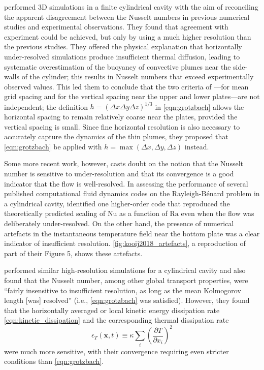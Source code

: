\documentclass[titlepage]{article}
\numberwithin{equation}{section}
\newcommand{\pdiff}[2]{\frac{\partial #1}{\partial #2}}
\renewcommand\vec{\bm}
\newcommand{\rayleigh}{\ensuremath{\mathrm{Ra}}}
\newcommand{\nusselt}{\ensuremath{\mathrm{Nu}}}
\newcommand{\rb}{Rayleigh-B\'{e}nard}
\begin{document}
\textcite{stevens2010} performed 3D simulations in a finite cylindrical cavity
with the aim of reconciling the apparent disagreement between the Nusselt
numbers in previous numerical studies and experimental observations. They found
that agreement with experiment could be achieved, but only by using a much
higher resolution than the previous studies. They offered the physical
explanation that horizontally under-resolved simulations produce insufficient
thermal diffusion, leading to systematic overestimation of the buoyancy of
convective plumes near the side-walls of the cylinder; this results in Nusselt
numbers that exceed experimentally observed values. This led them to conclude
that the two criteria of \textcite{grotzbach1983}---for mean grid spacing
and for the vertical spacing near the upper and lower plates---are not
independent; the definition $h = (\Delta x \Delta y \Delta z)^{1/3}$ in
\cref{eqn:grotzbach} allows the horizontal spacing to remain relatively
coarse near the plates, provided the vertical spacing is small. Since
fine horizontal resolution is also necessary to accurately capture
the dynamics of the thin plumes, they proposed that \cref{eqn:grotzbach} be
applied with $h = \max(\Delta x, \Delta y, \Delta z)$ instead.

Some more recent work, however, casts doubt on the notion that the Nusselt
number is sensitive to under-resolution and that its convergence is a good
indicator that the flow is well-resolved. In assessing the performance of
several published computational fluid dynamics codes on the \rb{} problem in a
cylindrical cavity, \textcite{kooij2018} identified one higher-order code that
reproduced the theoretically predicted scaling of $\nusselt$ as a function of
$\rayleigh$ even when the flow was deliberately under-resolved. On the other
hand, the presence of numerical artefacts in the instantaneous temperature
field near the bottom plate was a clear indicator of insufficient resolution.
\cref{fig:kooij2018_artefacts}, a reproduction of part of their Figure 5, shows
these artefacts.

\textcite{scheel2013} performed similar high-resolution simulations for
a cylindrical cavity and also found that the Nusselt number, among other
global transport properties, were ``fairly insensitive to insufficient
resolution, as long as the mean Kolmogorov length [was] resolved'' (i.e.,
\cref{eqn:grotzbach} was satisfied). However, they found that the horizontally
averaged or local kinetic energy dissipation rate
\cref{eqn:kinetic_dissipation} and the corresponding thermal dissipation rate
\begin{equation}
    \label{eqn:thermal_dissipation}
    \epsilon_T(\vec{x}, t) \equiv \kappa \sum_i \left(\pdiff{T}{x_i}\right)^2
\end{equation}
were much more sensitive, with their convergence requiring even stricter
conditions than \cref{eqn:grotzbach}.
\end{document}
